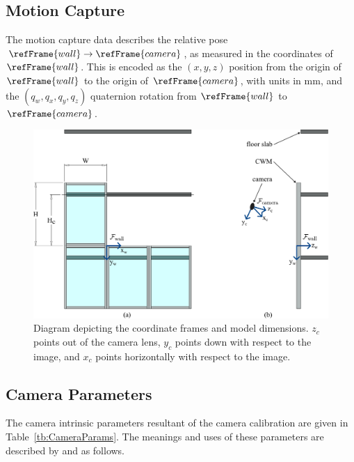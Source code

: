\documentclass[11pt]{article}
\newcommand{\tbref}[1]{Table~\ref{#1}}
\begin{document}
\subsection*{Motion Capture}
The motion capture data describes the relative pose $\refFrame{wall}\rightarrow\refFrame{camera}$, as measured in the coordinates of $\refFrame{wall}$. This is encoded as the $(x, y, z)$ position from the origin of $\refFrame{wall}$ to the origin of $\refFrame{camera}$, with units in mm, and the $(q_w, q_x, q_y, q_z)$ quaternion rotation from $\refFrame{wall}$ to $\refFrame{camera}$.

\begin{figure}[!t]
	\centering
	\centerline{\includegraphics[width=1\columnwidth,keepaspectratio]{fig/ExpDimensions.pdf}}
	\caption{Diagram depicting the coordinate frames and model dimensions. $z_c$ points out of the camera lens, $y_c$ points down with respect to the image, and $x_c$ points horizontally with respect to the image.}
    \label{fig:ExpDimensions}
\end{figure}


\subsection*{Camera Parameters}
The camera intrinsic parameters resultant of the camera calibration are given in \tbref{tb:CameraParams}. The meanings and uses of these parameters are described by \cite{BJ4-53,BJ4-54,BJb-02,BJb-03} and as follows.
\end{document}
